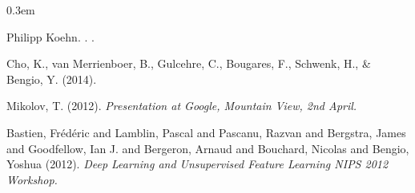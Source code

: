 \documentclass[11pt,letterpaper]{article}
\begin{document}
\begin{thebibliography}{} \itemsep 0.3em

Philipp Koehn.
.
.

Cho, K., van Merrienboer, B., Gulcehre, C., Bougares, F., Schwenk, H., \& Bengio, Y.
\newblock (2014).

Mikolov, T.
\newblock (2012).
\newblock \textit{Presentation at Google, Mountain View, 2nd April.}

Bastien, Fr{\'{e}}d{\'{e}}ric and Lamblin, Pascal and Pascanu, Razvan and Bergstra, James and Goodfellow, Ian J. and Bergeron, Arnaud and Bouchard, Nicolas and Bengio, Yoshua
\newblock (2012).
\newblock \textit{Deep Learning and Unsupervised Feature Learning NIPS 2012 Workshop.}

\end{thebibliography}
\end{document}
